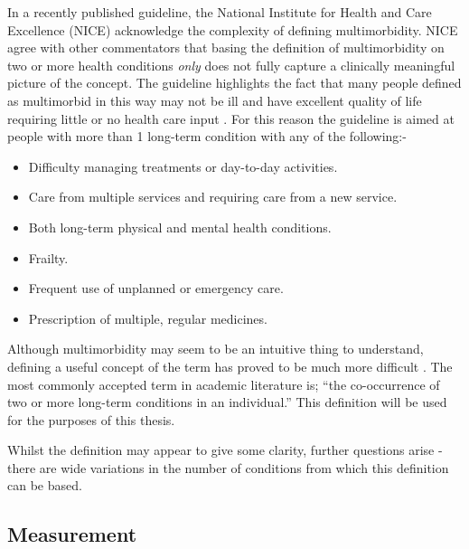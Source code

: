 \documentclass[12pt,]{report}
\providecommand{\tightlist}{%
  \setlength{\itemsep}{0pt}\setlength{\parskip}{0pt}}
\begin{document}
In a recently published guideline, the National Institute for Health and
Care Excellence (NICE) \citep{RN226} acknowledge the complexity of
defining multimorbidity. NICE agree with other commentators \citep{RN21}
that basing the definition of multimorbidity on two or more health
conditions \textit{only} does not fully capture a clinically meaningful
picture of the concept. The guideline highlights the fact that many
people defined as multimorbid in this way may not be ill and have
excellent quality of life requiring little or no health care input
\citep{RN226}. For this reason the guideline is aimed at people with
more than 1 long-term condition with any of the following:-

\begin{itemize}
\tightlist
\item
  Difficulty managing treatments or day-to-day activities.
\item
  Care from multiple services and requiring care from a new service.
\item
  Both long-term physical and mental health conditions.
\item
  Frailty.
\item
  Frequent use of unplanned or emergency care.
\item
  Prescription of multiple, regular medicines.
\end{itemize}

\citep{RN226}

Although multimorbidity may seem to be an intuitive thing to understand,
defining a useful concept of the term has proved to be much more
difficult \citep{RN155}. The most commonly accepted term in academic
literature is; ``the co-occurrence of two or more long-term conditions
in an individual.'' This definition will be used for the purposes of
this thesis.

Whilst the definition may appear to give some clarity, further questions
arise - there are wide variations in the number of conditions from which
this definition can be based.

\subsection{Measurement}\label{subsec:mm-measures}
\end{document}
